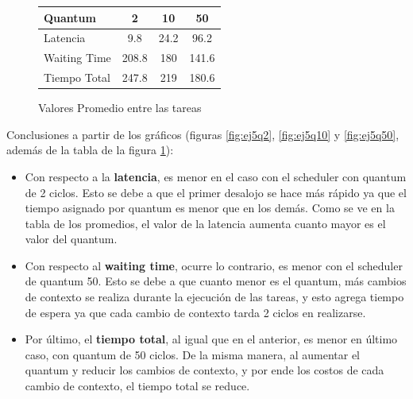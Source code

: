 \hspace{4em}

\begin{figure}[H]
\caption{Valores Promedio entre las tareas}
\label{fig:ej5-tabla}
\begin{center}
\begin{tabular}{| l | c | c | c |}
\hline  
\textbf{Quantum} & \textbf{2} & \textbf{10} & \textbf{50} \\ \hline
Latencia & 9.8 & 24.2 & 96.2 \\ \hline
Waiting Time & 208.8 & 180 & 141.6 \\ \hline
Tiempo Total & 247.8 & 219 & 180.6 \\ \hline
\end{tabular}
\end{center}
\end{figure}

Conclusiones a partir de los gráficos (figuras \ref{fig:ej5q2}, \ref{fig:ej5q10} y \ref{fig:ej5q50}, además de la tabla de la figura \ref{fig:ej5-tabla}): 

\begin{itemize}

\item Con respecto a la \textbf{latencia}, es menor en el caso con el scheduler con quantum de 2 ciclos. Esto se debe a que el primer desalojo se hace más rápido ya que el tiempo asignado por quantum es menor que en los demás. Como se ve en la tabla de los promedios, el valor de la latencia aumenta cuanto mayor es el valor del quantum.
\item Con respecto al \textbf{waiting time}, ocurre lo contrario, es menor con el scheduler de quantum 50. Esto se debe a que cuanto menor es el quantum, más cambios de contexto se realiza durante la ejecución de las tareas, y esto agrega tiempo de espera ya que cada cambio de contexto tarda 2 ciclos en realizarse.
\item Por último, el \textbf{tiempo total}, al igual que en el anterior, es menor en último caso, con quantum de 50 ciclos. De la misma manera, al aumentar el quantum y reducir los cambios de contexto, y por ende los costos de cada cambio de contexto, el tiempo total se reduce.
\end{itemize}




